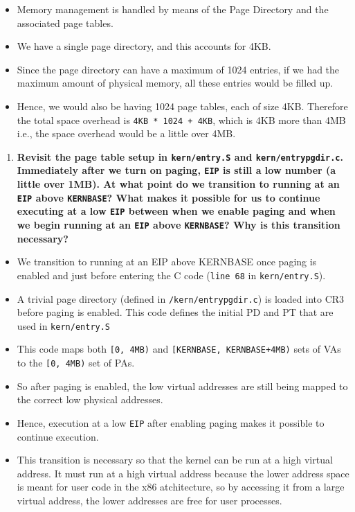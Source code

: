 \documentclass[]{article}
\begin{document}
\begin{itemize}
\itemsep1pt\parskip0pt
\item
  Memory management is handled by means of the Page Directory and the
  associated page tables.
\item
  We have a single page directory, and this accounts for 4KB.
\item
  Since the page directory can have a maximum of 1024 entries, if we had
  the maximum amount of physical memory, all these entries would be
  filled up.
\item
  Hence, we would also be having 1024 page tables, each of size 4KB.
  Therefore the total space overhead is \texttt{4KB * 1024 + 4KB}, which
  is 4KB more than 4MB i.e., the space overhead would be a little over
  4MB.
\end{itemize}

\begin{enumerate}
\def\labelenumi{\arabic{enumi}.}
\setcounter{enumi}{5}
\itemsep1pt\parskip0pt
\item
  \textbf{Revisit the page table setup in \texttt{kern/entry.S} and
  \texttt{kern/entrypgdir.c}. Immediately after we turn on paging,
  \texttt{EIP} is still a low number (a little over 1MB). At what point
  do we transition to running at an \texttt{EIP} above
  \texttt{KERNBASE}? What makes it possible for us to continue executing
  at a low \texttt{EIP} between when we enable paging and when we begin
  running at an \texttt{EIP} above \texttt{KERNBASE}? Why is this
  transition necessary?}
\end{enumerate}

\begin{itemize}
\itemsep1pt\parskip0pt
\item
  We transition to running at an EIP above KERNBASE once paging is
  enabled and just before entering the C code (\texttt{line 68} in
  \texttt{kern/entry.S}).
\item
  A trivial page directory (defined in \texttt{/kern/entrypgdir.c}) is
  loaded into CR3 before paging is enabled. This code defines the
  initial PD and PT that are used in \texttt{kern/entry.S}
\item
  This code maps both \texttt{{[}0, 4MB)} and
  \texttt{{[}KERNBASE, KERNBASE+4MB)} sets of VAs to the
  \texttt{{[}0, 4MB)} set of PAs.
\item
  So after paging is enabled, the low virtual addresses are still being
  mapped to the correct low physical addresses.
\item
  Hence, execution at a low \texttt{EIP} after enabling paging makes it
  possible to continue execution.
\item
  This transition is necessary so that the kernel can be run at a high
  virtual address. It must run at a high virtual address because the
  lower address space is meant for user code in the x86 atchitecture, so
  by accessing it from a large virtual address, the lower addresses are
  free for user processes.
\end{itemize}
\end{document}
